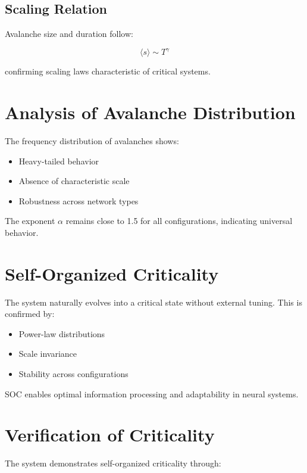 \documentclass[12pt]{article}
\begin{document}
\subsection{Scaling Relation}
Avalanche size and duration follow:

\begin{equation}
\langle s \rangle \sim T^\gamma
\end{equation}

confirming scaling laws characteristic of critical systems.

\section{Analysis of Avalanche Distribution}

The frequency distribution of avalanches shows:

\begin{itemize}
\item Heavy-tailed behavior
\item Absence of characteristic scale
\item Robustness across network types
\end{itemize}

The exponent $\alpha$ remains close to 1.5 for all configurations, indicating universal behavior.

\section{Self-Organized Criticality}

The system naturally evolves into a critical state without external tuning. This is confirmed by:

\begin{itemize}
\item Power-law distributions
\item Scale invariance
\item Stability across configurations
\end{itemize}

SOC enables optimal information processing and adaptability in neural systems.

\section{Verification of Criticality}

The system demonstrates self-organized criticality through:
\end{document}
